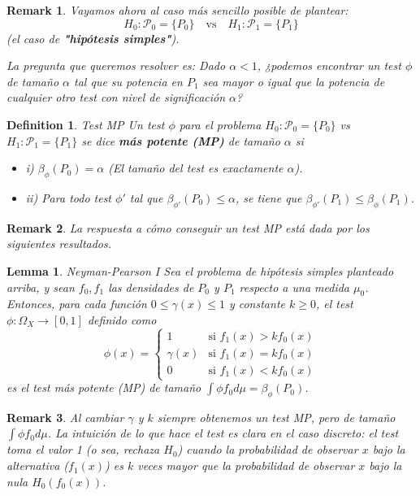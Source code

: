 \documentclass{article}
\theoremstyle{remarkstyle}
\newtheorem*{remark}{Remark}
\theoremstyle{examplestyle}
\theoremstyle{definitionstyle}
\newtheorem*{definition}{Definition}
\theoremstyle{lemmastyle}
\newtheorem*{lemma}{Lemma}
\theoremstyle{theoremstyle}
\begin{document}
\begin{remark}
Vayamos ahora al caso más sencillo posible de plantear:
\[ H_0: \mathcal{P}_0 = \{P_0\} \quad \text{vs} \quad H_1: \mathcal{P}_1 = \{P_1\} \]
(el caso de \textbf{"hipótesis simples"}).

La pregunta que queremos resolver es:
Dado $\alpha < 1$, ¿podemos encontrar un test $\phi$ de tamaño $\alpha$ tal que su potencia en $P_1$ sea mayor o igual que la potencia de cualquier otro test con nivel de significación $\alpha$?
\end{remark}

\begin{definition} Test MP
Un test $\phi$ para el problema $H_0: \mathcal{P}_0=\{P_0\}$ vs $H_1: \mathcal{P}_1=\{P_1\}$ se dice \textbf{más potente (MP)} de tamaño $\alpha$ si
\begin{itemize}
    \item i) $\beta_\phi(P_0) = \alpha$ (El tamaño del test es exactamente $\alpha$).
    \item ii) Para todo test $\phi'$ tal que $\beta_{\phi'}(P_0) \le \alpha$, se tiene que $\beta_{\phi'}(P_1) \le \beta_\phi(P_1)$.
\end{itemize}
\end{definition}

\begin{remark}
La respuesta a cómo conseguir un test MP está dada por los siguientes resultados.
\end{remark}

\begin{lemma} Neyman-Pearson I
Sea el problema de hipótesis simples planteado arriba, y sean $f_0, f_1$ las densidades de $P_0$ y $P_1$ respecto a una medida $\mu_0$.
Entonces, para cada función $0 \le \gamma(x) \le 1$ y constante $k \ge 0$, el test
$\phi: \Omega_X \to [0,1]$ definido como
\[ \phi(x) = \begin{cases} 1 & \text{si } f_1(x) > k f_0(x) \\ \gamma(x) & \text{si } f_1(x) = k f_0(x) \\ 0 & \text{si } f_1(x) < k f_0(x) \end{cases} \]
es el test más potente (MP) de tamaño $\int \phi f_0 d\mu = \beta_\phi(P_0)$.
\end{lemma}

\begin{remark}
Al cambiar $\gamma$ y $k$ siempre obtenemos un test MP, pero de tamaño $\int \phi f_0 d\mu$.
La intuición de lo que hace el test es clara en el caso discreto: el test toma el valor 1 (o sea, rechaza $H_0$) cuando la probabilidad de observar $x$ bajo la alternativa ($f_1(x)$) es $k$ veces mayor que la probabilidad de observar $x$ bajo la nula $H_0(f_0(x))$.
\end{remark}
\end{document}
